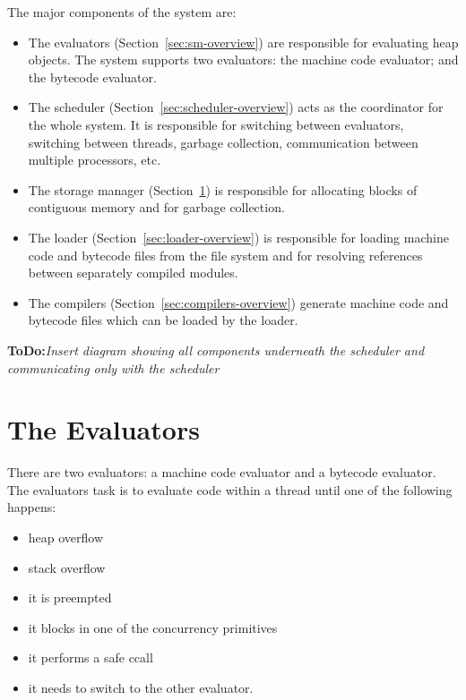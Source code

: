 \documentclass[11pt]{article}
\newcommand{\ToDo}[1]{{{\bf ToDo:}\sl #1}}
\newcommand{\secref}[1]{Section~\ref{sec:#1}}
\newcommand{\Section}[2]{\section{#1}\label{sec:#2}}
\begin{document}
The major components of the system are:
\begin{itemize}

\item 

The evaluators (\secref{sm-overview}) are responsible for
evaluating heap objects.  The system supports two evaluators: the
machine code evaluator; and the bytecode evaluator.

\item 

The scheduler (\secref{scheduler-overview}) acts as the
coordinator for the whole system.  It is responsible for switching
between evaluators, switching between threads, garbage collection,
communication between multiple processors, etc.

\item 

The storage manager (\secref{evaluators-overview}) is
responsible for allocating blocks of contiguous memory and for garbage
collection.

\item 

The loader (\secref{loader-overview}) is responsible for
loading machine code and bytecode files from the file system and for
resolving references between separately compiled modules.

\item 

The compilers (\secref{compilers-overview}) generate machine
code and bytecode files which can be loaded by the loader.

\end{itemize}

\ToDo{Insert diagram showing all components underneath the scheduler
and communicating only with the scheduler}


\Section{The Evaluators}{evaluators-overview}

There are two evaluators: a machine code evaluator and a bytecode
evaluator.  The evaluators task is to evaluate code within a thread
until one of the following happens:

\begin{itemize}
\item heap overflow
\item stack overflow
\item it is preempted
\item it blocks in one of the concurrency primitives
\item it performs a safe ccall
\item it needs to switch to the other evaluator.
\end{itemize}
\end{document}
